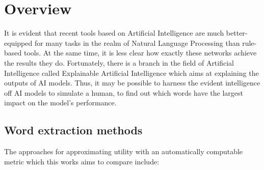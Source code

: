 \section{Overview}
It is evident that recent tools based on Artificial Intelligence are much better-equipped for many tasks in the realm of Natural Language Processing than rule-based tools.
At the same time, it is less clear how exactly these networks achieve the results they do.
Fortunately, there is a branch in the field of Artificial Intelligence called Explainable Artificial Intelligence which aims at explaining the outputs of AI models.
Thus, it may be possible to harness the evident intelligence off AI models to simulate a human, to find out which words have the largest impact on the model's performance.

\subsection{Word extraction methods}
The approaches for approximating utility with an automatically computable metric which this works aims to compare include:
